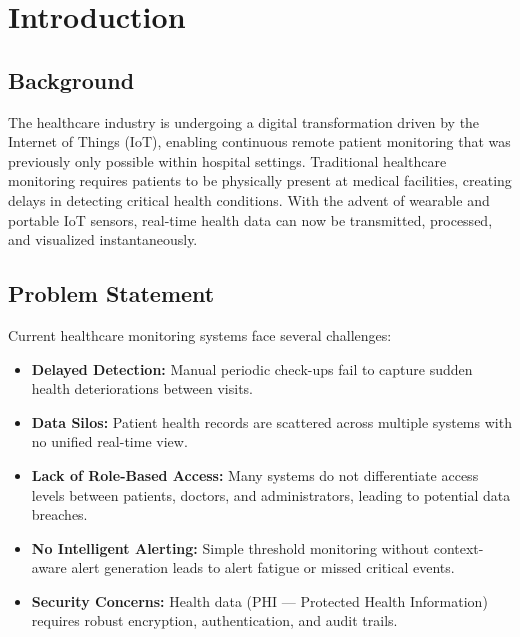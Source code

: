 \chapter{Introduction}

\section{Background}
The healthcare industry is undergoing a digital transformation driven by the Internet of Things (IoT), enabling continuous remote patient monitoring that was previously only possible within hospital settings. Traditional healthcare monitoring requires patients to be physically present at medical facilities, creating delays in detecting critical health conditions. With the advent of wearable and portable IoT sensors, real-time health data can now be transmitted, processed, and visualized instantaneously.

\section{Problem Statement}
Current healthcare monitoring systems face several challenges:
\begin{itemize}[leftmargin=*]
    \item \textbf{Delayed Detection:} Manual periodic check-ups fail to capture sudden health deteriorations between visits.
    \item \textbf{Data Silos:} Patient health records are scattered across multiple systems with no unified real-time view.
    \item \textbf{Lack of Role-Based Access:} Many systems do not differentiate access levels between patients, doctors, and administrators, leading to potential data breaches.
    \item \textbf{No Intelligent Alerting:} Simple threshold monitoring without context-aware alert generation leads to alert fatigue or missed critical events.
    \item \textbf{Security Concerns:} Health data (PHI --- Protected Health Information) requires robust encryption, authentication, and audit trails.
\end{itemize}

